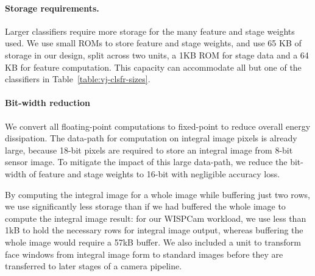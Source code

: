 


\paragraph{Storage requirements.}
Larger classifiers require more storage for the many feature and stage weights used.
We use small ROMs to store feature and stage weights, and use 65 KB of storage in our design,
split across two units, a 1KB ROM for stage data and a 64 KB for feature computation. This capacity
can accommodate all but one of the classifiers in Table~\ref{table:vj-clsfr-sizes}.

\paragraph{Bit-width reduction} We convert all floating-point computations
to fixed-point to reduce overall energy dissipation. The
data-path for computation on integral image pixels is already large, because 18-bit pixels are
required to store an integral image from 8-bit sensor image. To mitigate the impact of this large data-path,
we reduce the bit-width of feature and stage weights to 16-bit with negligible accuracy loss.

By computing the integral image for a whole image while buffering just two rows, we use significantly less storage than if we had buffered the whole image to compute the integral image result: for our WISPCam workload, we use less than 1kB to hold the necessary rows for integral image output, whereas buffering the whole image would require a 57kB buffer.
We also included a unit to transform face windows from integral image form to standard images before they are transferred to later stages of a camera pipeline.

